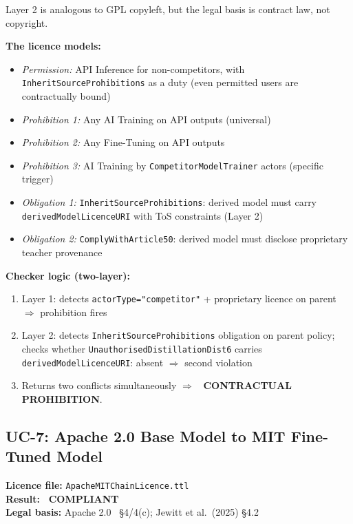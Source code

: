 \documentclass[12pt,a4paper]{article}
\newcommand{\compliant}{\textcolor{compliant}{\textbf{\checkmark\ COMPLIANT}}}
\newcommand{\violated}[1]{\textcolor{violation}{\textbf{\texttimes\ #1}}}
\begin{document}
Layer 2 is analogous to GPL copyleft, but the legal basis is contract law, not copyright.

\textbf{The licence models:}
\begin{itemize}[noitemsep]
  \item \emph{Permission:} API Inference for non-competitors, with \texttt{InheritSourceProhibitions} as a duty (even permitted users are contractually bound)
  \item \emph{Prohibition 1:} Any AI Training on API outputs (universal)
  \item \emph{Prohibition 2:} Any Fine-Tuning on API outputs
  \item \emph{Prohibition 3:} AI Training by \texttt{CompetitorModelTrainer} actors (specific trigger)
  \item \emph{Obligation 1:} \texttt{InheritSourceProhibitions}: derived model must carry \texttt{derivedModelLicenceURI} with ToS constraints (Layer 2)
  \item \emph{Obligation 2:} \texttt{ComplyWithArticle50}: derived model must disclose proprietary teacher provenance
\end{itemize}

\textbf{Checker logic (two-layer):}
\begin{enumerate}[noitemsep]
  \item Layer 1: detects \texttt{actorType="competitor"} + proprietary licence on parent $\Rightarrow$ prohibition fires
  \item Layer 2: detects \texttt{InheritSourceProhibitions} obligation on parent policy; checks whether \texttt{UnauthorisedDistillationDist6} carries \texttt{derivedModelLicenceURI}: absent $\Rightarrow$ second violation
  \item Returns two conflicts simultaneously $\Rightarrow$ \violated{CONTRACTUAL PROHIBITION}.
\end{enumerate}

\subsection{UC-7: Apache 2.0 Base Model to MIT Fine-Tuned Model}
\textbf{Licence file:} \texttt{ApacheMITChainLicence.ttl}\\[2pt]
\textbf{Result:} \compliant\\[4pt]
\textbf{Legal basis:} Apache 2.0~\cite{apache20} \S 4/4(c); Jewitt et al.\ (2025) \S 4.2
\end{document}
